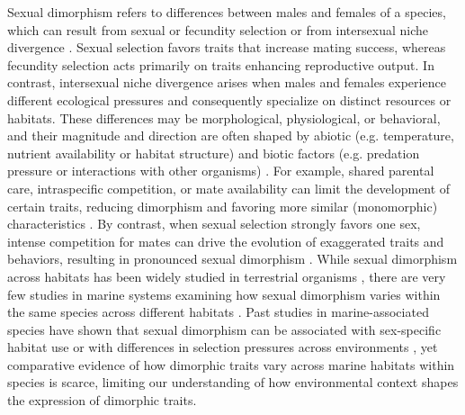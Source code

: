 \documentclass[journal,article,submit,pdftex,moreauthors]{Definitions/mdpi}
\begin{document}
Sexual dimorphism refers to differences between males and females of a species, which can result from sexual or fecundity selection or from intersexual niche divergence \citep{shine1989, andersson1994, stillwell2010}. Sexual selection favors traits that increase mating success, whereas fecundity selection acts primarily on traits enhancing reproductive output. In contrast, intersexual niche divergence arises when males and females experience different ecological pressures and consequently specialize on distinct resources or habitats. These differences may be morphological, physiological, or behavioral, and their magnitude and direction are often shaped by abiotic (e.g. temperature, nutrient availability or habitat structure) and biotic factors (e.g. predation pressure or interactions with other organisms)  \citep{shine1989, endler1992}. For example, shared parental care, intraspecific competition, or mate availability can limit the development of certain traits, reducing dimorphism and favoring more similar (monomorphic) characteristics  \citep{clutton2007sexual}. By contrast, when sexual selection strongly favors one sex, intense competition for mates can drive the evolution of exaggerated traits and behaviors, resulting in pronounced sexual dimorphism \citep{andersson1994, darwin1871, lande1980}. While sexual dimorphism across habitats has been widely studied in terrestrial organisms  \citep{ford1994evolution, geist1988sexual}, there are very few studies in marine systems examining how sexual dimorphism varies within the same species across different habitats \citep{cleasby2015sexual, losos2003sexual, wikelski1997body}. Past studies in marine-associated species have shown that sexual dimorphism can be associated with sex-specific habitat use \citep{cleasby2015sexual} or with differences in selection pressures across environments \citep{wikelski1997body}, yet comparative evidence of how dimorphic traits vary across marine habitats within species is scarce, limiting our understanding of how environmental context shapes the expression of dimorphic traits.    
\end{document}
